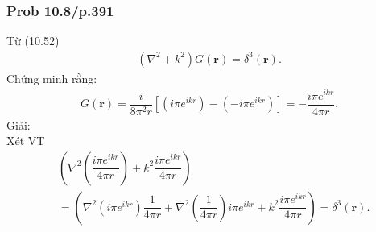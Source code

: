 \documentclass{report}
\newcommand{\f}[2]{\dfrac{#1}{#2}}
\begin{document}
\subsubsection{Prob 10.8/p.391}
Từ (10.52)
\begin{align*}
	\left( \nabla^2 + k^2 \right)G(\mathbf{r}) = \delta^3(\mathbf{r}).
\end{align*}
Chứng minh rằng:
\begin{align*}
	G(\mathbf{r}) = \f{i}{8\pi^2 r} \left[ \left( i\pi e^{ikr} \right) - \left( -i\pi e^{ikr} \right) \right] = -\f{i\pi e^{ikr}}{4\pi r}.
\end{align*}
Giải:\\
Xét VT
\begin{align*}
	 & \left( \nabla^2\left(\f{i\pi e^{ikr}}{4\pi r}\right) + k^2 \f{i\pi e^{ikr}}{4\pi r}\right)                                                                              \\
	 & =\left( \nabla^2\left(i\pi e^{ikr}\right)\f{1}{4\pi r} + \nabla^2\left(\f{1}{4\pi r}\right)i\pi e^{ikr} + k^2 \f{i\pi e^{ikr}}{4\pi r}\right) = \delta^{3}(\mathbf{r}).
\end{align*}
\end{document}
